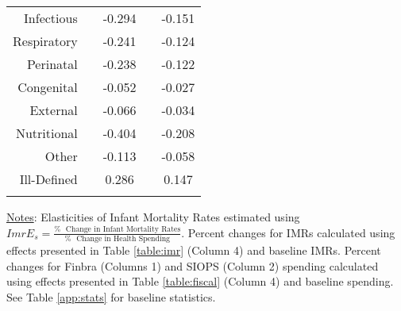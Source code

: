 \begin{table}[h!]
\begin{footnotesize}
\begin{center}
{\begin{threeparttable}[b]
\begin{tabular}{rrrrr}
    \multicolumn{1}{p{15.145em}}{Infectious} &       & \multicolumn{1}{c}{-0.294} &       & \multicolumn{1}{c}{-0.151} \\
    \multicolumn{1}{p{15.145em}}{Respiratory} &       & \multicolumn{1}{c}{-0.241} &       & \multicolumn{1}{c}{-0.124} \\
    \multicolumn{1}{p{15.145em}}{Perinatal} &       & \multicolumn{1}{c}{-0.238} &       & \multicolumn{1}{c}{-0.122} \\
    \multicolumn{1}{p{15.145em}}{Congenital} &       & \multicolumn{1}{c}{-0.052} &       & \multicolumn{1}{c}{-0.027} \\
    \multicolumn{1}{p{15.145em}}{External} &       & \multicolumn{1}{c}{-0.066} &       & \multicolumn{1}{c}{-0.034} \\
    \multicolumn{1}{p{15.145em}}{Nutritional} &       & \multicolumn{1}{c}{-0.404} &       & \multicolumn{1}{c}{-0.208} \\
    \multicolumn{1}{p{15.145em}}{Other} &       & \multicolumn{1}{c}{-0.113} &       & \multicolumn{1}{c}{-0.058} \\
    \multicolumn{1}{p{15.145em}}{Ill-Defined} &       & \multicolumn{1}{c}{0.286} &       & \multicolumn{1}{c}{0.147} \\
          &       &       &       &  \\
    \bottomrule
    \bottomrule
    \end{tabular}%
    
    
        \begin{tablenotes}
  \scriptsize{\underline{Notes}: Elasticities of Infant Mortality Rates estimated using $ImrE_s = \frac{\% \, \, \textrm{ Change in Infant Mortality Rates}}{\% \, \, \textrm{ Change in Health Spending}}$. Percent changes for IMRs calculated using effects presented in Table \ref{table:imr} (Column 4) and baseline IMRs. Percent changes for Finbra (Columns 1) and SIOPS (Column 2) spending calculated using effects presented in Table \ref{table:fiscal} (Column 4) and baseline spending. See Table \ref{app:stats} for baseline statistics.}
  \end{tablenotes}
    
  \label{table:elasticity}%

\end{threeparttable}
}
\end{center}
\end{footnotesize}
\end{table}
